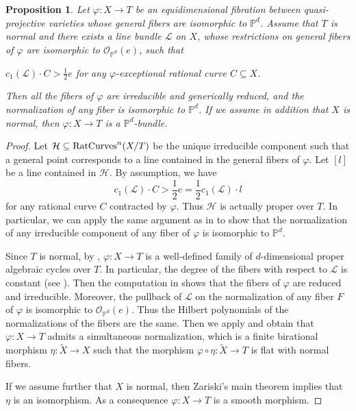\documentclass[english,reqno]{amsart}
\newcommand\cH{{\mathcal H}}
\newcommand\bbP{{\mathbb P}}
\newcommand\sL{{\mathscr L}}
\newcommand\sO{{\mathscr O}}
\newcommand{\RC}[1]{\ensuremath{\mbox{\rm RatCurves}^n(#1)}}
\theoremstyle{plain}
\newtheorem{prop}[thm]{Proposition}
\theoremstyle{definition}
\numberwithin{equation}{section} %
\begin{document}
\begin{prop}
	\label{PROP:HN-degeneration-of-projective-spaces}
	Let  $\varphi\colon X\rightarrow T$ be an equidimensional fibration  between quasi-projective varieties  whose general fibers are isomorphic to $\bbP^d$. Assume that $T$ is normal and there exists a line bundle $\sL$ on $X$, whose restrictions on general fibers of $\varphi$ are isomorphic to $\sO_{\mathbb{P}^d}(e)$,  such that
	\begin{center}
		$c_1(\sL)\cdot C > \frac{1}{2} e$   for any  $\varphi$-exceptional rational curve  $C\subseteq  X$.
	\end{center}
	Then all the fibers of $\varphi$ are irreducible and generically reduced, and the normalization of any fiber is isomorphic to  $\bbP^d$.
	If we assume in addition that $X$ is normal, then   $\varphi\colon X\rightarrow T$ is a $\bbP^d$-bundle.
\end{prop}

\begin{proof}
	Let $\cH\subseteq \RC{X/T}$ be the unique irreducible component such that a general point corresponds to a line contained in the general fibers of $\varphi$. Let $[l]$ be a line contained in $\cH$. By assumption, we have
	\[
	c_1(\sL)\cdot C> \frac{1}{2}e = \frac{1}{2} c_1(\sL)\cdot l
	\]
	for any rational curve $C$ contracted by $\varphi$.
	Thus   $\cH$ is actually proper over $T$.
	In particular, we can apply the same argument as in \cite[p.222, Proof of Propositon 3.1]{HoeringNovelli2013} to show that the normalization of any irreducible component of any fiber of $\varphi$ is isomorphic to $\bbP^d$.
	
	
	Since $T$ is normal, by \cite[I, Definition 3.10 and Theorem 3.17]{Kollar1996}, $\varphi\colon X\rightarrow T$ is a well-defined family of $d$-dimensional proper algebraic cycles over $T$.
	In particular, the degree of the fibers with respect to $\sL$ is constant (see \cite[I, Lemma 3.17.1]{Kollar1996}).
	Then the computation   in \cite[p.223, Proof of Proposition 3.1]{HoeringNovelli2013} shows that the fibers of $\varphi$ are reduced and irreducible.
	Moreover, the pullback of $\sL$  on the normalization of any fiber $F$ of $\varphi$ is isomorphic to $\sO_{\bbP^d}(e)$.
	Thus the Hilbert polynomials of the normalizations of the fibers are the same.
	Then we apply \cite[Theorem 12]{Kollar2011} and obtain that $\varphi\colon X\rightarrow T$ admits a simultaneous normalization, which is a finite  birational morphism $\eta\colon \widetilde{X}\rightarrow X$ such that  the morphism $\varphi\circ\eta\colon \widetilde{X}\rightarrow T$ is flat with normal fibers.
	
	If we assume further that $X$ is normal, then Zariski's main theorem \cite[V, Theorem 5.2]{Hartshorne1977} implies that $\eta$ is an isomorphism. As a consequence  $\varphi\colon X\rightarrow T$ is a smooth morphism.
\end{proof}
\end{document}
